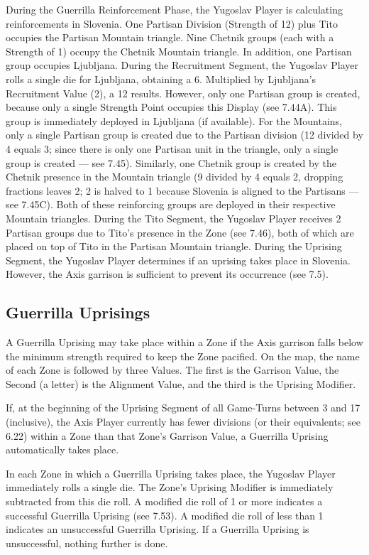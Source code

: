 During the Guerrilla Reinforcement Phase, the Yugoslav Player is calculating reinforcements in Slovenia. One Partisan Division (Strength of 12) plus Tito occupies the Partisan Mountain triangle. Nine Chetnik groups (each with a Strength of 1) occupy the Chetnik Mountain triangle. In addition, one Partisan group occupies Ljubljana. During the Recruitment Segment, the Yugoslav Player rolls a single die for Ljubljana, obtaining a 6. Multiplied by Ljubljana’s Recruitment Value (2), a 12 results. However, only one Partisan group is created, because only a single Strength Point occupies this Display (see 7.44A). This group is immediately deployed in Ljubljana (if available). For the Mountains, only a single Partisan group is created due to the Partisan division (12 divided by 4 equals 3; since there is only one Partisan unit in the triangle, only a single group is created — see 7.45). Similarly, one Chetnik group is created by the Chetnik presence in the Mountain triangle (9 divided by 4 equals 2\textonequarter, dropping fractions leaves 2; 2 is halved to 1 because Slovenia is aligned to the Partisans — see 7.45C). Both of these reinforcing groups are deployed in their respective Mountain triangles. During the Tito Segment, the Yugoslav Player receives 2 Partisan groups due to Tito’s presence in the Zone (see 7.46), both of which are placed on top of Tito in the Partisan Mountain triangle. During the Uprising Segment, the Yugoslav Player determines if an uprising takes place in Slovenia. However, the Axis garrison is sufficient to prevent its occurrence (see 7.5).

\subsection{Guerrilla Uprisings}\label{sec:7.5}

A Guerrilla Uprising may take place within a Zone if the Axis garrison falls below the minimum strength required to keep the Zone pacified. On the map, the name of each Zone is followed by three Values. The first is the Garrison Value, the Second (a letter) is the Alignment Value, and the third is the Uprising Modifier.

 If, at the beginning of the Uprising Segment of all Game-Turns between 3 and 17 (inclusive), the Axis Player currently has fewer divisions (or their equivalents; see 6.22) within a Zone than that Zone’s Garrison Value, a Guerrilla Uprising automatically takes place.

 In each Zone in which a Guerrilla Uprising takes place, the Yugoslav Player immediately rolls a single die. The Zone’s Uprising Modifier is immediately subtracted from this die roll. A modified die roll of 1 or more indicates a successful Guerrilla Uprising (see 7.53). A modified die roll of less than 1 indicates an unsuccessful Guerrilla Uprising. If a Guerrilla Uprising is unsuccessful, nothing further is done.

